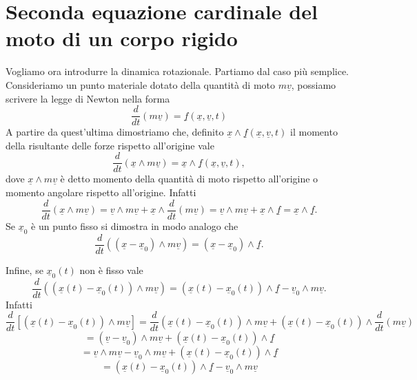 \section{Seconda equazione cardinale del moto di un corpo rigido}


Vogliamo ora introdurre la dinamica rotazionale. Partiamo dal caso più semplice. Consideriamo un punto materiale dotato della quantità di moto \(m\underline{v}\), possiamo scrivere la legge di Newton nella forma
\[
\frac{d}{dt}(m\underline{v}) = \underline{f}(\underline{x}, \underline{v}, t)
\]
A partire da quest'ultima  dimostriamo che, definito \( \underline{x} \wedge \underline{f}(\underline{x}, \underline{v}, t) \) il momento della risultante delle forze rispetto all'origine vale
\[
\frac{d}{dt}(\underline{x} \wedge m\underline{v}) = \underline{x} \wedge \underline{f}(\underline{x}, \underline{v}, t),
\]
dove \( \underline{x} \wedge m\underline{v} \) è detto momento della quantità di moto rispetto all'origine o momento angolare rispetto all'origine. Infatti
\[
\frac{d}{dt} (\underline{x} \wedge m \underline{v}) = \underline{v} \wedge m\underline{v} + \underline{x} \wedge \frac{d}{dt}(m\underline{v}) = \underline{v} \wedge m\underline{v} + \underline{x} \wedge \underline{f} = \underline{x} \wedge \underline{f}.
\]
Se \( \underline{x}_0 \) è un punto fisso si dimostra in modo analogo che
\[
\frac{d}{dt} \left( (\underline{x} - \underline{x}_0) \wedge m\underline{v} \right) = (\underline{x} - \underline{x}_0) \wedge \underline{f}.
\]

Infine, se \( \underline{x}_0(t) \) non è fisso vale
\[
\frac{d}{dt} \left( (\underline{x}(t) - \underline{x}_0(t)) \wedge m\underline{v} \right) = (\underline{x}(t) - \underline{x}_0(t)) \wedge \underline{f} - \underline{v}_0 \wedge m\underline{v}.
\]
Infatti
\[
\frac{d}{dt}
\left[
(\underline{x}(t)-\underline{x}_0(t))\wedge m\underline{v}
\right]
=
\frac{d}{dt}
(\underline{x}(t)-\underline{x}_0(t))
\wedge m\underline{v}
+
(\underline{x}(t)-\underline{x}_0(t))
\wedge
\frac{d}{dt}(m\underline{v})
\]
\[
=
(\underline{v}-\underline{v}_0)\wedge m\underline{v}
+
(\underline{x}(t)-\underline{x}_0(t))\wedge \underline{f}
\]
\[
=
\underline{v}\wedge m\underline{v}
-
\underline{v}_0\wedge m\underline{v}
+
(\underline{x}(t)-\underline{x}_0(t))\wedge \underline{f}
\]
\[
=
(\underline{x}(t)-\underline{x}_0(t))\wedge \underline{f}
-
\underline{v}_0\wedge m\underline{v}
\]

